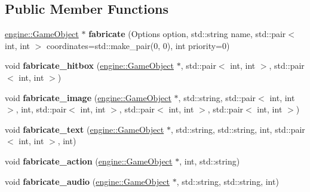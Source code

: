 \subsection*{Public Member Functions}
\begin{DoxyCompactItemize}
\item 
\hyperlink{classengine_1_1_game_object}{engine\+::\+Game\+Object} $\ast$ {\bfseries fabricate} (Options option, std\+::string name, std\+::pair$<$ int, int $>$ coordinates=std\+::make\+\_\+pair(0, 0), int priority=0)\hypertarget{classmindscape_1_1_game_object_factory_aad9cecdf58a0786aaa33e321ced1038f}{}\label{classmindscape_1_1_game_object_factory_aad9cecdf58a0786aaa33e321ced1038f}

\item 
void {\bfseries fabricate\+\_\+hitbox} (\hyperlink{classengine_1_1_game_object}{engine\+::\+Game\+Object} $\ast$, std\+::pair$<$ int, int $>$, std\+::pair$<$ int, int $>$)\hypertarget{classmindscape_1_1_game_object_factory_ae6342abe8f47706db529207ae4488cae}{}\label{classmindscape_1_1_game_object_factory_ae6342abe8f47706db529207ae4488cae}

\item 
void {\bfseries fabricate\+\_\+image} (\hyperlink{classengine_1_1_game_object}{engine\+::\+Game\+Object} $\ast$, std\+::string, std\+::pair$<$ int, int $>$, int, std\+::pair$<$ int, int $>$, std\+::pair$<$ int, int $>$, std\+::pair$<$ int, int $>$)\hypertarget{classmindscape_1_1_game_object_factory_a2a8f43a73aad02f18e6b09fb5656bd3d}{}\label{classmindscape_1_1_game_object_factory_a2a8f43a73aad02f18e6b09fb5656bd3d}

\item 
void {\bfseries fabricate\+\_\+text} (\hyperlink{classengine_1_1_game_object}{engine\+::\+Game\+Object} $\ast$, std\+::string, std\+::string, int, std\+::pair$<$ int, int $>$, int)\hypertarget{classmindscape_1_1_game_object_factory_a6110cb0f4f7a7c0608529087cd6a621f}{}\label{classmindscape_1_1_game_object_factory_a6110cb0f4f7a7c0608529087cd6a621f}

\item 
void {\bfseries fabricate\+\_\+action} (\hyperlink{classengine_1_1_game_object}{engine\+::\+Game\+Object} $\ast$, int, std\+::string)\hypertarget{classmindscape_1_1_game_object_factory_a6872e0a49e1fbc2c0c709f5fd911e2f0}{}\label{classmindscape_1_1_game_object_factory_a6872e0a49e1fbc2c0c709f5fd911e2f0}

\item 
void {\bfseries fabricate\+\_\+audio} (\hyperlink{classengine_1_1_game_object}{engine\+::\+Game\+Object} $\ast$, std\+::string, std\+::string, int)\hypertarget{classmindscape_1_1_game_object_factory_a5b69216b064c326d6aacbae95dd87cc2}{}\label{classmindscape_1_1_game_object_factory_a5b69216b064c326d6aacbae95dd87cc2}


\end{DoxyCompactItemize}
